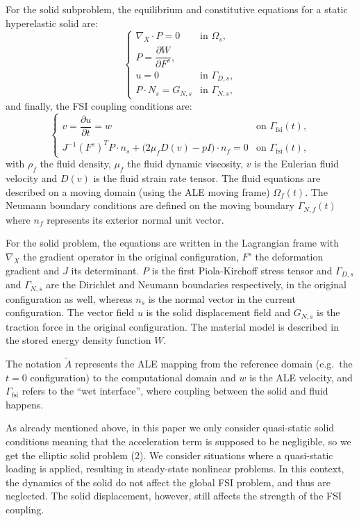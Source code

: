 \documentclass[11pt]{article}
\begin{document}
For the solid subproblem, the equilibrium and constitutive equations for a static hyperelastic solid are:
\begin{equation}
\tag{2}
\begin{cases}
\nabla_X \cdot P = 0 & \text{in } \Omega_s,\\[0.5em]
P = \dfrac{\partial W}{\partial F^s},\\[0.5em]
u = 0 & \text{in } \Gamma_{D,s},\\[0.5em]
P \cdot N_s = G_{N,s} & \text{in } \Gamma_{N,s},
\end{cases}
\end{equation}
and finally, the FSI coupling conditions are:
\begin{equation}
\tag{3}
\begin{cases}
v = \dfrac{\partial u}{\partial t} = w & \text{on } \Gamma_{\mathrm{fsi}}(t),\\[0.75em]
J^{-1}(F^s)^T P \cdot n_s + \big(2\mu_f D(v) - pI\big)\cdot n_f = 0 & \text{on } \Gamma_{\mathrm{fsi}}(t),
\end{cases}
\end{equation}
with $\rho_f$ the fluid density, $\mu_f$ the fluid dynamic viscosity, $v$ is the Eulerian fluid velocity and $D(v)$ is the fluid strain rate tensor. The fluid equations are described on a moving domain (using the ALE moving frame) $\Omega_f(t)$. The Neumann boundary conditions are defined on the moving boundary $\Gamma_{N,f}(t)$ where $n_f$ represents its exterior normal unit vector.

For the solid problem, the equations are written in the Lagrangian frame with $\nabla_X$ the gradient operator in the original configuration, $F^s$ the deformation gradient and $J$ its determinant. $P$ is the first Piola-Kirchoff stress tensor and $\Gamma_{D,s}$ and $\Gamma_{N,s}$ are the Dirichlet and Neumann boundaries respectively, in the original configuration as well, whereas $n_s$ is the normal vector in the current configuration. The vector field $u$ is the solid displacement field and $G_{N,s}$ is the traction force in the original configuration. The material model is described in the stored energy density function $W$.

The notation $\tilde{A}$ represents the ALE mapping from the reference domain (e.g.\ the $t=0$ configuration) to the computational domain and $w$ is the ALE velocity, and $\Gamma_{\mathrm{fsi}}$ refers to the ``wet interface'', where coupling between the solid and fluid happens.

As already mentioned above, in this paper we only consider quasi-static solid conditions meaning that the acceleration term is supposed to be negligible, so we get the elliptic solid problem (2). We consider situations where a quasi-static loading is applied, resulting in steady-state nonlinear problems. In this context, the dynamics of the solid do not affect the global FSI problem, and thus are neglected. The solid displacement, however, still affects the strength of the FSI coupling.
\end{document}
